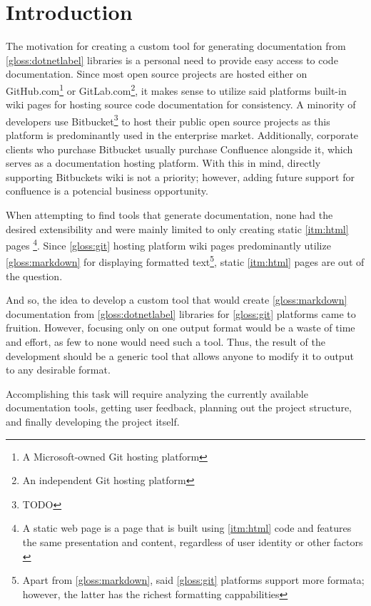 \chapter*{Introduction}

The motivation for creating a custom tool for generating documentation from \ref{gloss:dotnetlabel} libraries is a personal need to provide easy access to code documentation. Since most open source projects are hosted either on GitHub.com\footnote{A Microsoft-owned Git hosting platform} or GitLab.com\footnote{An independent Git hosting platform}, it makes sense to utilize said platforms built-in wiki pages for hosting source code documentation for consistency. A minority of developers use Bitbucket\footnote{TODO} to host their public open source projects as this platform is predominantly used in the enterprise market. Additionally, corporate clients who purchase Bitbucket usually purchase Confluence alongside it, which serves as a documentation hosting platform. With this in mind, directly supporting Bitbuckets wiki is not a priority; however, adding future support for confluence is a potencial business opportunity.

When attempting to find tools that generate documentation, none had the desired extensibility and were mainly limited to only creating static \ref{itm:html} pages
\footnote{A static web page is a page that is built using \ref{itm:html} code and features the same presentation and content, regardless of user identity or other factors \cite{techopedia_what_2017}}.
Since \ref{gloss:git} hosting platform wiki pages predominantly utilize \ref{gloss:markdown} for displaying formatted text\footnote{Apart from \ref{gloss:markdown}, said \ref{gloss:git} platforms support more formata; however, the latter has the richest formatting cappabilities}, static \ref{itm:html} pages are out of the question.

And so, the idea to develop a custom tool that would create \ref{gloss:markdown} documentation from \ref{gloss:dotnetlabel} libraries for \ref{gloss:git} platforms came to fruition. However, focusing only on one output format would be a waste of time and effort, as few to none would need such a tool. Thus, the result of the development should be a generic tool that allows anyone to modify it to output to any desirable format.

Accomplishing this task will require analyzing the currently available documentation tools, getting user feedback, planning out the project structure, and finally developing the project itself.

